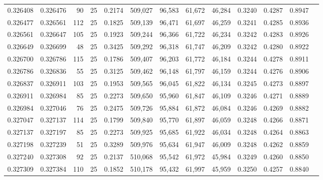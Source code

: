 \begin{tabular}{rrrrrrrrrrrrr}
0.326408 & 0.326476 &    90 &  25 &                                     0.2174 & 509,027 &  96,583 &  61,672 &  46,284 & 0.3240 & 0.4287 & 0.8947 \\
0.326477 & 0.326561 &   112 &  25 &                                     0.1825 & 509,139 &  96,471 &  61,697 &  46,259 & 0.3241 & 0.4285 & 0.8936 \\
0.326561 & 0.326647 &   105 &  25 &                                     0.1923 & 509,244 &  96,366 &  61,722 &  46,234 & 0.3242 & 0.4283 & 0.8926 \\
0.326649 & 0.326699 &    48 &  25 &                                     0.3425 & 509,292 &  96,318 &  61,747 &  46,209 & 0.3242 & 0.4280 & 0.8922 \\
0.326700 & 0.326786 &   115 &  25 &                                     0.1786 & 509,407 &  96,203 &  61,772 &  46,184 & 0.3244 & 0.4278 & 0.8911 \\
0.326786 & 0.326836 &    55 &  25 &                                     0.3125 & 509,462 &  96,148 &  61,797 &  46,159 & 0.3244 & 0.4276 & 0.8906 \\
0.326837 & 0.326911 &   103 &  25 &                                     0.1953 & 509,565 &  96,045 &  61,822 &  46,134 & 0.3245 & 0.4273 & 0.8897 \\
0.326911 & 0.326984 &    85 &  25 &                                     0.2273 & 509,650 &  95,960 &  61,847 &  46,109 & 0.3246 & 0.4271 & 0.8889 \\
0.326984 & 0.327046 &    76 &  25 &                                     0.2475 & 509,726 &  95,884 &  61,872 &  46,084 & 0.3246 & 0.4269 & 0.8882 \\
0.327047 & 0.327137 &   114 &  25 &                                     0.1799 & 509,840 &  95,770 &  61,897 &  46,059 & 0.3248 & 0.4266 & 0.8871 \\
0.327137 & 0.327197 &    85 &  25 &                                     0.2273 & 509,925 &  95,685 &  61,922 &  46,034 & 0.3248 & 0.4264 & 0.8863 \\
0.327198 & 0.327239 &    51 &  25 &                                     0.3289 & 509,976 &  95,634 &  61,947 &  46,009 & 0.3248 & 0.4262 & 0.8859 \\
0.327240 & 0.327308 &    92 &  25 &                                     0.2137 & 510,068 &  95,542 &  61,972 &  45,984 & 0.3249 & 0.4260 & 0.8850 \\
0.327309 & 0.327384 &   110 &  25 &                                     0.1852 & 510,178 &  95,432 &  61,997 &  45,959 & 0.3250 & 0.4257 & 0.8840 \\

\end{tabular}
